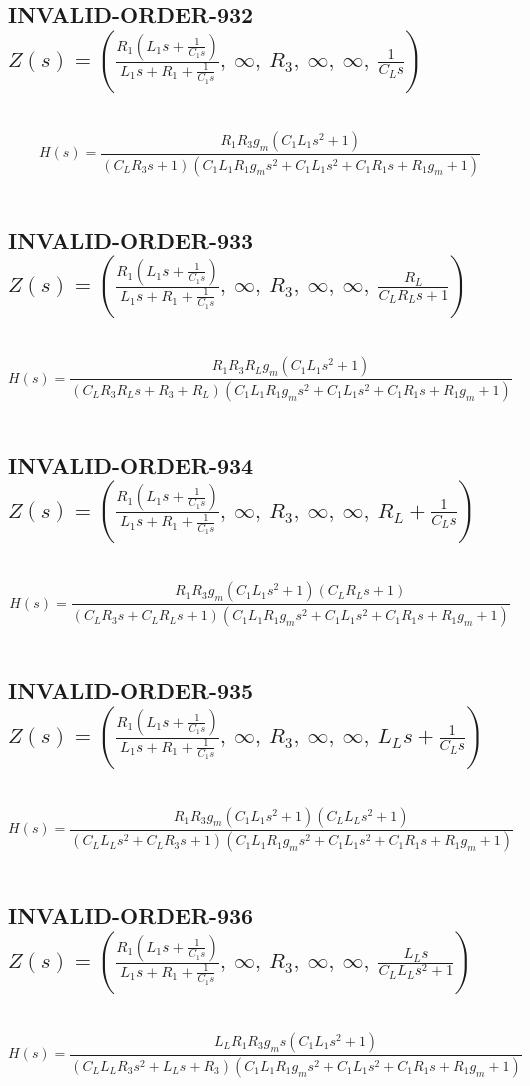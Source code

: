 \documentclass{article}
\begin{document}
\subsection{INVALID-ORDER-932 $Z(s) = \left( \frac{R_{1} \left(L_{1} s + \frac{1}{C_{1} s}\right)}{L_{1} s + R_{1} + \frac{1}{C_{1} s}}, \  \infty, \  R_{3}, \  \infty, \  \infty, \  \frac{1}{C_{L} s}\right)$ } \ 
\textbf{\[H(s) = \frac{R_{1} R_{3} g_{m} \left(C_{1} L_{1} s^{2} + 1\right)}{\left(C_{L} R_{3} s + 1\right) \left(C_{1} L_{1} R_{1} g_{m} s^{2} + C_{1} L_{1} s^{2} + C_{1} R_{1} s + R_{1} g_{m} + 1\right)}\] } \ 
\subsection{INVALID-ORDER-933 $Z(s) = \left( \frac{R_{1} \left(L_{1} s + \frac{1}{C_{1} s}\right)}{L_{1} s + R_{1} + \frac{1}{C_{1} s}}, \  \infty, \  R_{3}, \  \infty, \  \infty, \  \frac{R_{L}}{C_{L} R_{L} s + 1}\right)$ } \ 
\textbf{\[H(s) = \frac{R_{1} R_{3} R_{L} g_{m} \left(C_{1} L_{1} s^{2} + 1\right)}{\left(C_{L} R_{3} R_{L} s + R_{3} + R_{L}\right) \left(C_{1} L_{1} R_{1} g_{m} s^{2} + C_{1} L_{1} s^{2} + C_{1} R_{1} s + R_{1} g_{m} + 1\right)}\] } \ 
\subsection{INVALID-ORDER-934 $Z(s) = \left( \frac{R_{1} \left(L_{1} s + \frac{1}{C_{1} s}\right)}{L_{1} s + R_{1} + \frac{1}{C_{1} s}}, \  \infty, \  R_{3}, \  \infty, \  \infty, \  R_{L} + \frac{1}{C_{L} s}\right)$ } \ 
\textbf{\[H(s) = \frac{R_{1} R_{3} g_{m} \left(C_{1} L_{1} s^{2} + 1\right) \left(C_{L} R_{L} s + 1\right)}{\left(C_{L} R_{3} s + C_{L} R_{L} s + 1\right) \left(C_{1} L_{1} R_{1} g_{m} s^{2} + C_{1} L_{1} s^{2} + C_{1} R_{1} s + R_{1} g_{m} + 1\right)}\] } \ 
\subsection{INVALID-ORDER-935 $Z(s) = \left( \frac{R_{1} \left(L_{1} s + \frac{1}{C_{1} s}\right)}{L_{1} s + R_{1} + \frac{1}{C_{1} s}}, \  \infty, \  R_{3}, \  \infty, \  \infty, \  L_{L} s + \frac{1}{C_{L} s}\right)$ } \ 
\textbf{\[H(s) = \frac{R_{1} R_{3} g_{m} \left(C_{1} L_{1} s^{2} + 1\right) \left(C_{L} L_{L} s^{2} + 1\right)}{\left(C_{L} L_{L} s^{2} + C_{L} R_{3} s + 1\right) \left(C_{1} L_{1} R_{1} g_{m} s^{2} + C_{1} L_{1} s^{2} + C_{1} R_{1} s + R_{1} g_{m} + 1\right)}\] } \ 
\subsection{INVALID-ORDER-936 $Z(s) = \left( \frac{R_{1} \left(L_{1} s + \frac{1}{C_{1} s}\right)}{L_{1} s + R_{1} + \frac{1}{C_{1} s}}, \  \infty, \  R_{3}, \  \infty, \  \infty, \  \frac{L_{L} s}{C_{L} L_{L} s^{2} + 1}\right)$ } \ 
\textbf{\[H(s) = \frac{L_{L} R_{1} R_{3} g_{m} s \left(C_{1} L_{1} s^{2} + 1\right)}{\left(C_{L} L_{L} R_{3} s^{2} + L_{L} s + R_{3}\right) \left(C_{1} L_{1} R_{1} g_{m} s^{2} + C_{1} L_{1} s^{2} + C_{1} R_{1} s + R_{1} g_{m} + 1\right)}\] } \ 
\end{document}
